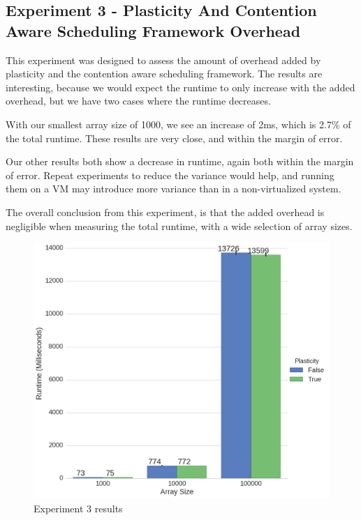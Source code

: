 



\subsection{Experiment 3 - Plasticity And Contention Aware Scheduling Framework Overhead}

This experiment was designed to assess the amount of overhead added by plasticity and the contention aware scheduling framework. The results are interesting, because we would expect the runtime to only increase with the added overhead, but we have two cases where the runtime decreases. 

With our smallest array size of 1000, we see an increase of 2ms, which is 2.7\% of the total runtime. These results are very close, and within the margin of error. 

Our other results both show a decrease in runtime, again both within the margin of error. Repeat experiments to reduce the variance would help, and running them on a VM may introduce more variance than in a non-virtualized system.

The overall conclusion from this experiment, is that the added overhead is negligible when measuring the total runtime, with a wide selection of array sizes.



\begin{figure}[H]
	\centering
	\includegraphics[width=\textwidth]{graphics/experiment3.png}
	\caption{Experiment 3 results}
	\label{fig:results_ex3}
\end{figure}


